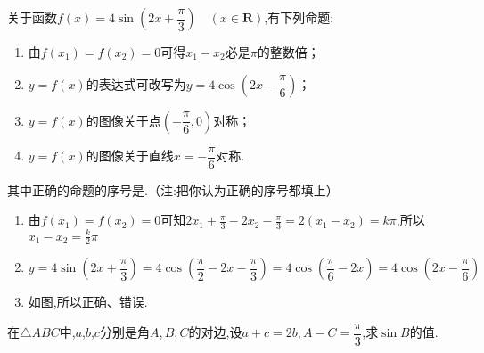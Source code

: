 \begin{questions}
	\question 关于函数$f(x)=4\sin \left( 2x + \dfrac{\pi}{3} \right)\quad (x\in \mathbf{R})$,有下列命题:
	\begin{enumerate}[label=\protect\circled{\arabic*}]
		\item 由$f(x_1) = f(x_2) = 0$可得$x_1 - x_2$必是$\pi$的整数倍；
		\item $y=f(x)$的表达式可改写为$y=4\cos \left( 2x - \dfrac{\pi}{6} \right)$；
		\item $y=f(x)$的图像关于点$\left( -\dfrac{\pi}{6}, 0\right)$对称；
		\item $y=f(x)$的图像关于直线$x=-\dfrac{\pi}{6}$对称.
	\end{enumerate}
	其中正确的命题的序号是.（注:把你认为正确的序号都填上）

	\begin{solution}
		\begin{enumerate}[label=\protect\circled{\arabic*}]
			\item 由$f(x_1) = f(x_2) = 0$可知$2x_1 + \frac{\pi}{3} - 2x_2 - \frac{\pi}{3} = 2(x_1-x_2) =
				      k\pi$,所以$x_1-x_2=\frac{k}{2}\pi$  \textcolor{red}{\times}
			\item $y=4\sin \left( 2x + \dfrac{\pi}{3} \right)=4\cos \left( \dfrac{\pi}{2} - 2x - \dfrac{\pi}{3} \right)
				      = 4\cos \left( \dfrac{\pi}{6} - 2x \right) = 4\cos \left( 2x - \dfrac{\pi}{6} \right)$ \textcolor{red}{\checkmark}
			\item 如图,所以正确、错误.

			      \begin{center}
			      \end{center}

		\end{enumerate}
	\end{solution}
	\question 在$\triangle{ABC}$中,$a$,$b$,$c$分别是角$A,B,C$的对边,设$a+c=2b,
		A-C=\dfrac{\pi}{3}$,求$\sin{B}$的值.


\end{questions}
